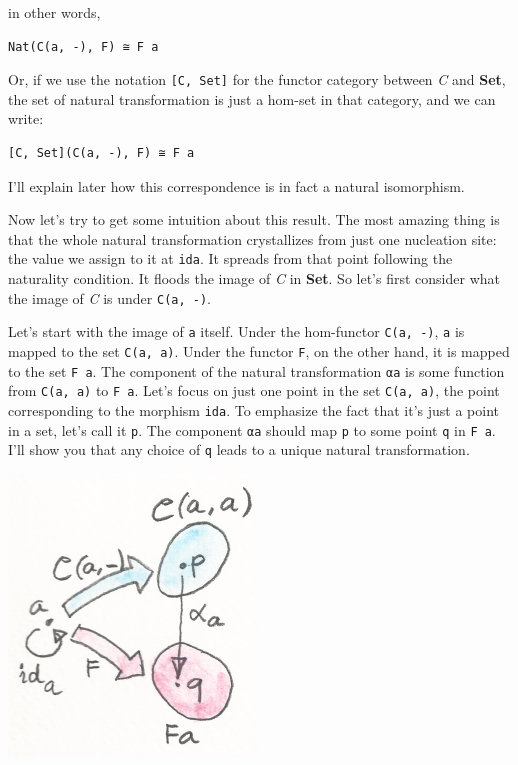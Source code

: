 in other words,

\begin{verbatim}
Nat(C(a, -), F) ≅ F a
\end{verbatim}

Or, if we use the notation \texttt{{[}C,\ Set{]}} for the functor
category between \emph{C} and \textbf{Set}, the set of natural
transformation is just a hom-set in that category, and we can write:

\begin{verbatim}
[C, Set](C(a, -), F) ≅ F a
\end{verbatim}

I'll explain later how this correspondence is in fact a natural
isomorphism.

Now let's try to get some intuition about this result. The most amazing
thing is that the whole natural transformation crystallizes from just
one nucleation site: the value we assign to it at \texttt{ida}. It
spreads from that point following the naturality condition. It floods
the image of \emph{C} in \textbf{Set}. So let's first consider what the
image of \emph{C} is under \texttt{C(a,\ -)}.

Let's start with the image of \texttt{a} itself. Under the hom-functor
\texttt{C(a,\ -)}, \texttt{a} is mapped to the set \texttt{C(a,\ a)}.
Under the functor \texttt{F}, on the other hand, it is mapped to the set
\texttt{F\ a}. The component of the natural transformation \texttt{αa}
is some function from \texttt{C(a,\ a)} to \texttt{F\ a}. Let's focus on
just one point in the set \texttt{C(a,\ a)}, the point corresponding to
the morphism \texttt{ida}. To emphasize the fact that it's just a point
in a set, let's call it \texttt{p}. The component \texttt{αa} should map
\texttt{p} to some point \texttt{q} in \texttt{F\ a}. I'll show you that
any choice of \texttt{q} leads to a unique natural transformation.

\includegraphics{images/yoneda3.png}

